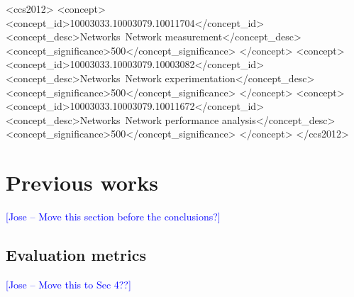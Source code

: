 \documentclass[10pt,sigconf,letterpaper,anonymous,nonacm]{acmart}
\newcommand{\js}[1]{\textcolor{blue}{[Jose -- #1]}}
\begin{document}
\begin{CCSXML}
<ccs2012>
   <concept>
       <concept_id>10003033.10003079.10011704</concept_id>
       <concept_desc>Networks~Network measurement</concept_desc>
       <concept_significance>500</concept_significance>
       </concept>
   <concept>
       <concept_id>10003033.10003079.10003082</concept_id>
       <concept_desc>Networks~Network experimentation</concept_desc>
       <concept_significance>500</concept_significance>
       </concept>
   <concept>
       <concept_id>10003033.10003079.10011672</concept_id>
       <concept_desc>Networks~Network performance analysis</concept_desc>
       <concept_significance>500</concept_significance>
       </concept>
 </ccs2012>
\end{CCSXML}





\maketitle



\section{Previous works}
\js{Move this section before the conclusions?}






\subsection{Evaluation metrics}
\js{Move this to Sec 4??}
\end{document}
